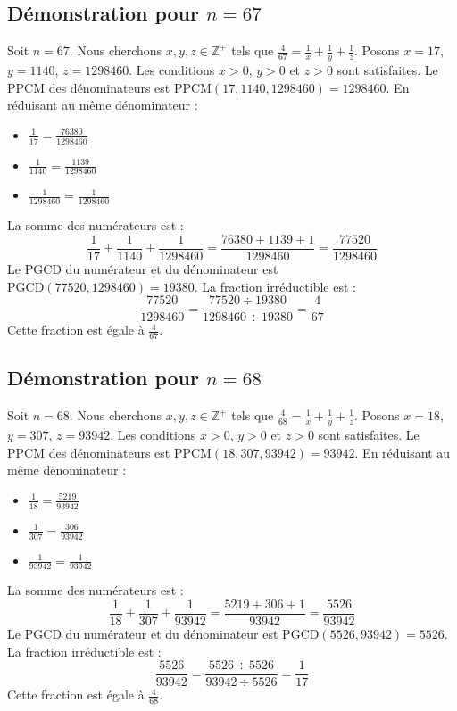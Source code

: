 \documentclass[11pt,a4paper]{article}
\begin{document}
\subsection{Démonstration pour $n = 67$}
Soit $n = 67$. Nous cherchons $x, y, z \in \mathbb{Z}^{+}$ tels que $\frac{4}{67} = \frac{1}{x} + \frac{1}{y} + \frac{1}{z}$.
Posons $x = 17$, $y = 1140$, $z = 1298460$.
Les conditions $x > 0$, $y > 0$ et $z > 0$ sont satisfaites.
Le PPCM des dénominateurs est $\text{PPCM}(17, 1140, 1298460) = 1298460$.
En réduisant au même dénominateur :
\begin{itemize}
    \item $\frac{1}{17} = \frac{76380}{1298460}$
    \item $\frac{1}{1140} = \frac{1139}{1298460}$
    \item $\frac{1}{1298460} = \frac{1}{1298460}$
\end{itemize}
La somme des numérateurs est :
$$ \frac{1}{17} + \frac{1}{1140} + \frac{1}{1298460} = \frac{76380 + 1139 + 1}{1298460} = \frac{77520}{1298460} $$
Le PGCD du numérateur et du dénominateur est $\text{PGCD}(77520, 1298460) = 19380$.
La fraction irréductible est :
$$ \frac{77520}{1298460} = \frac{77520 \div 19380}{1298460 \div 19380} = \frac{4}{67} $$
Cette fraction est égale à $\frac{4}{67}$.

\subsection{Démonstration pour $n = 68$}
Soit $n = 68$. Nous cherchons $x, y, z \in \mathbb{Z}^{+}$ tels que $\frac{4}{68} = \frac{1}{x} + \frac{1}{y} + \frac{1}{z}$.
Posons $x = 18$, $y = 307$, $z = 93942$.
Les conditions $x > 0$, $y > 0$ et $z > 0$ sont satisfaites.
Le PPCM des dénominateurs est $\text{PPCM}(18, 307, 93942) = 93942$.
En réduisant au même dénominateur :
\begin{itemize}
    \item $\frac{1}{18} = \frac{5219}{93942}$
    \item $\frac{1}{307} = \frac{306}{93942}$
    \item $\frac{1}{93942} = \frac{1}{93942}$
\end{itemize}
La somme des numérateurs est :
$$ \frac{1}{18} + \frac{1}{307} + \frac{1}{93942} = \frac{5219 + 306 + 1}{93942} = \frac{5526}{93942} $$
Le PGCD du numérateur et du dénominateur est $\text{PGCD}(5526, 93942) = 5526$.
La fraction irréductible est :
$$ \frac{5526}{93942} = \frac{5526 \div 5526}{93942 \div 5526} = \frac{1}{17} $$
Cette fraction est égale à $\frac{4}{68}$.
\end{document}
